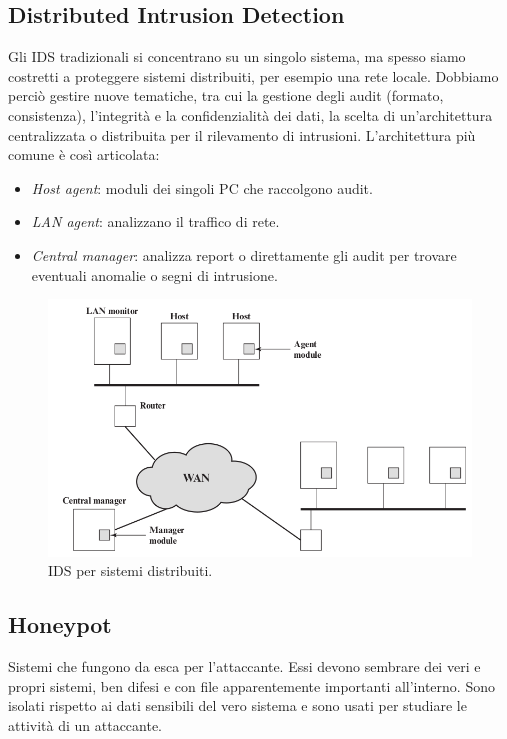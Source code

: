 \documentclass[a4paper, 11pt, notitlepage, fleqn]{report}
\begin{document}
\subsection{Distributed Intrusion Detection}
Gli IDS tradizionali si concentrano su un singolo sistema, ma spesso siamo costretti a proteggere sistemi distribuiti, per esempio una rete locale. Dobbiamo perciò gestire nuove tematiche, tra cui la gestione degli audit (formato, consistenza), l'integrità e la confidenzialità dei dati, la scelta di un'architettura centralizzata o distribuita per il rilevamento di intrusioni. L'architettura più comune è così articolata:
\begin{itemize}
	\item \emph{Host agent}: moduli dei singoli PC che raccolgono audit.
	\item \emph{LAN agent}: analizzano il traffico di rete.
	\item \emph{Central manager}: analizza report o direttamente gli audit per trovare eventuali anomalie o segni di intrusione.
\end{itemize}

\begin{figure}[htp]
	\centering
	\includegraphics[width=.9\textwidth]{images/LANIDS}
	\caption{IDS per sistemi distribuiti.}
\end{figure}

\subsection{Honeypot}
Sistemi che fungono da esca per l'attaccante. Essi devono sembrare dei veri e propri sistemi, ben difesi e con file apparentemente importanti all'interno. Sono isolati rispetto ai dati sensibili del vero sistema e sono usati per studiare le attività di un attaccante.
\end{document}
